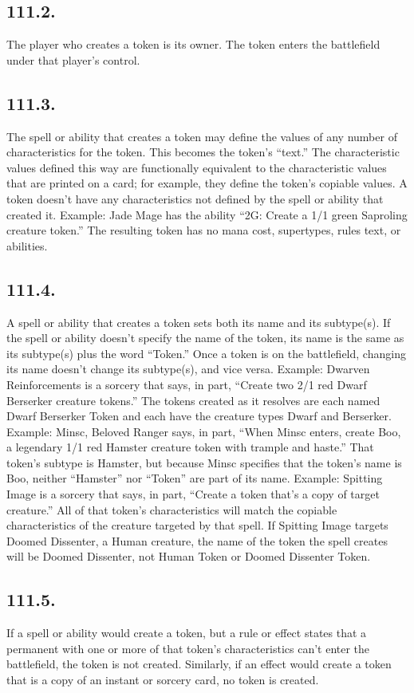 \subsection*{111.2.}
The player who creates a token is its owner. The token enters the battlefield under that player’s control.

\subsection*{111.3.}
The spell or ability that creates a token may define the values of any number of characteristics for the token. This becomes the token’s “text.” The characteristic values defined this way are functionally equivalent to the characteristic values that are printed on a card; for example, they define the token’s copiable values. A token doesn’t have any characteristics not defined by the spell or ability that created it.
Example: Jade Mage has the ability “{2}{G}: Create a 1/1 green Saproling creature token.” The resulting token has no mana cost, supertypes, rules text, or abilities.

\subsection*{111.4.}
A spell or ability that creates a token sets both its name and its subtype(s). If the spell or ability doesn’t specify the name of the token, its name is the same as its subtype(s) plus the word “Token.” Once a token is on the battlefield, changing its name doesn’t change its subtype(s), and vice versa.
Example: Dwarven Reinforcements is a sorcery that says, in part, “Create two 2/1 red Dwarf Berserker creature tokens.” The tokens created as it resolves are each named Dwarf Berserker Token and each have the creature types Dwarf and Berserker.
Example: Minsc, Beloved Ranger says, in part, “When Minsc enters, create Boo, a legendary 1/1 red Hamster creature token with trample and haste.” That token’s subtype is Hamster, but because Minsc specifies that the token’s name is Boo, neither “Hamster” nor “Token” are part of its name.
Example: Spitting Image is a sorcery that says, in part, “Create a token that’s a copy of target creature.” All of that token’s characteristics will match the copiable characteristics of the creature targeted by that spell. If Spitting Image targets Doomed Dissenter, a Human creature, the name of the token the spell creates will be Doomed Dissenter, not Human Token or Doomed Dissenter Token.

\subsection*{111.5.}
If a spell or ability would create a token, but a rule or effect states that a permanent with one or more of that token’s characteristics can’t enter the battlefield, the token is not created. Similarly, if an effect would create a token that is a copy of an instant or sorcery card, no token is created.

